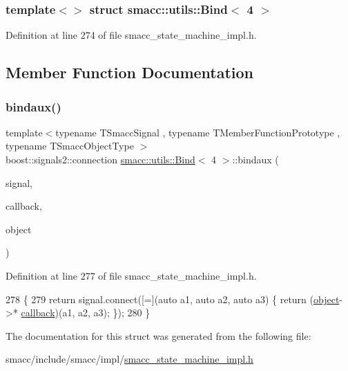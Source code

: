 \subsubsection*{template$<$$>$\newline
struct smacc\+::utils\+::\+Bind$<$ 4 $>$}



Definition at line 274 of file smacc\+\_\+state\+\_\+machine\+\_\+impl.\+h.



\subsection{Member Function Documentation}
\mbox{\label{structsmacc_1_1utils_1_1Bind_3_014_01_4_af999b2ea156fad369be761be47f83f18}} 
\subsubsection{\texorpdfstring{bindaux()}{bindaux()}}
{\footnotesize\ttfamily template$<$typename T\+Smacc\+Signal , typename T\+Member\+Function\+Prototype , typename T\+Smacc\+Object\+Type $>$ \\
boost\+::signals2\+::connection \hyperlink{structsmacc_1_1utils_1_1Bind}{smacc\+::utils\+::\+Bind}$<$ 4 $>$\+::bindaux (\begin{DoxyParamCaption}\item[{T\+Smacc\+Signal \&}]{signal,  }\item[{T\+Member\+Function\+Prototype}]{callback,  }\item[{T\+Smacc\+Object\+Type $\ast$}]{object }\end{DoxyParamCaption})\hspace{0.3cm}{\ttfamily [inline]}}



Definition at line 277 of file smacc\+\_\+state\+\_\+machine\+\_\+impl.\+h.


\begin{DoxyCode}
278   \{
279     \textcolor{keywordflow}{return} signal.connect([=](\textcolor{keyword}{auto} a1, \textcolor{keyword}{auto} a2, \textcolor{keyword}{auto} a3) \{ \textcolor{keywordflow}{return} (\hyperlink{classobject}{object}->*
      \hyperlink{servers_2opencv__perception__node_2opencv__perception__node_8cpp_a050e697bd654facce10ea3f6549669b3}{callback})(a1, a2, a3); \});
280   \}
\end{DoxyCode}


The documentation for this struct was generated from the following file\+:\begin{DoxyCompactItemize}
\item 
smacc/include/smacc/impl/\hyperlink{smacc__state__machine__impl_8h}{smacc\+\_\+state\+\_\+machine\+\_\+impl.\+h}\end{DoxyCompactItemize}
